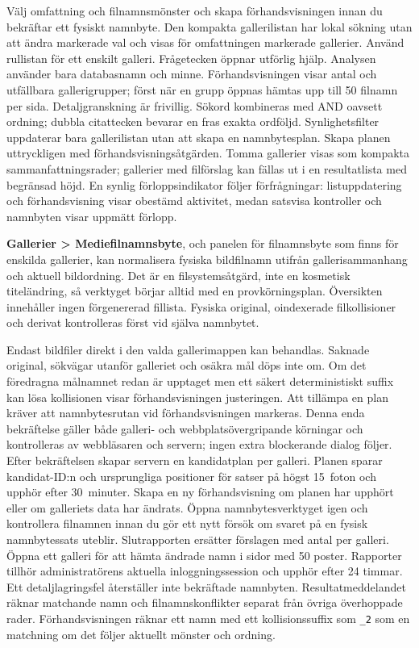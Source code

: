 \documentclass[11pt,a4paper]{article}
\newcommand{\ui}[1]{\textbf{#1}}
\newcommand{\codeword}[1]{\nolinkurl{#1}}
\begin{document}
Välj omfattning och filnamnsmönster och skapa förhandsvisningen innan du
bekräftar ett fysiskt namnbyte. Den kompakta gallerilistan har lokal sökning
utan att ändra markerade val och visas för omfattningen markerade gallerier.
Använd rullistan för ett enskilt galleri. Frågetecken öppnar utförlig hjälp.
Analysen använder bara databasnamn och minne. Förhandsvisningen visar antal och
utfällbara gallerigrupper; först när en grupp öppnas hämtas upp till 50 filnamn
per sida. Detaljgranskning är frivillig. Sökord kombineras med AND oavsett ordning; dubbla citattecken bevarar
en fras exakta ordföljd. Synlighetsfilter uppdaterar bara gallerilistan utan att
skapa en namnbytesplan. Skapa planen uttryckligen med förhandsvisningsåtgärden.
Tomma gallerier visas som kompakta sammanfattningsrader; gallerier med
filförslag kan fällas ut i en resultatlista med begränsad höjd. En synlig
förloppsindikator följer förfrågningar: listuppdatering och förhandsvisning
visar obestämd aktivitet, medan satsvisa kontroller och namnbyten visar uppmätt
förlopp.

\ui{Gallerier > Mediefilnamnsbyte}, och panelen för filnamnsbyte som finns för
enskilda gallerier, kan normalisera fysiska bildfilnamn utifrån
gallerisammanhang och aktuell bildordning. Det är en filsystemsåtgärd, inte en
kosmetisk titeländring, så verktyget börjar alltid med en provkörningsplan.
Översikten innehåller ingen förgenererad fillista. Fysiska original,
oindexerade filkollisioner och derivat kontrolleras först vid själva namnbytet.

Endast bildfiler direkt i den valda gallerimappen kan behandlas. Saknade
original, sökvägar utanför galleriet och osäkra mål döps inte om. Om det
föredragna målnamnet redan är upptaget men ett säkert deterministiskt suffix kan
lösa kollisionen visar förhandsvisningen justeringen. Att tillämpa en plan
kräver att namnbytesrutan vid förhandsvisningen markeras. Denna enda
bekräftelse gäller både galleri- och webbplatsövergripande körningar och
kontrolleras av webbläsaren och servern; ingen extra blockerande dialog följer.
Efter bekräftelsen skapar servern en kandidatplan per galleri. Planen sparar
kandidat-ID:n och ursprungliga positioner för satser på högst 15~foton och
upphör efter 30~minuter. Skapa en ny förhandsvisning om planen har upphört
eller om galleriets data har ändrats. Öppna namnbytesverktyget igen och
kontrollera filnamnen innan du gör ett nytt försök om svaret på en fysisk
namnbytessats uteblir.
Slutrapporten ersätter förslagen med antal per galleri. Öppna ett galleri för
att hämta ändrade namn i sidor med 50 poster. Rapporter tillhör administratörens
aktuella inloggningssession och upphör efter 24 timmar. Ett detaljlagringsfel
återställer inte bekräftade namnbyten.
Resultatmeddelandet räknar matchande namn och filnamnskonflikter separat
från övriga överhoppade rader.
Förhandsvisningen räknar ett namn med ett kollisionssuffix som
\codeword{\_2} som en matchning om det följer aktuellt mönster och ordning.
\end{document}

